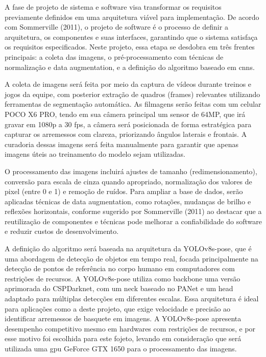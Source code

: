 \label{sssec:proj-sistema}

A fase de projeto de sistema e software visa transformar os requisitos previamente definidos em uma arquitetura viável para implementação. 
De acordo com Sommerville (2011), o projeto de software é o processo de definir a arquitetura, os componentes e suas interfaces, garantindo que o sistema satisfaça os requisitos especificados. 
Neste projeto, essa etapa se desdobra em três frentes principais: a coleta das imagens, o pré-processamento com técnicas de normalização e data augmentation, e a definição do algoritmo baseado em \acp{cnn}.

A coleta de imagens será feita por meio da captura de vídeos durante treinos e jogos da equipe, com posterior extração de quadros (frames) relevantes utilizando ferramentas de segmentação automática. 
As filmagens serão feitas com um celular POCO X6 PRO, tendo em sua câmera principal um sensor de 64MP, que irá gravar em 1080p a 30 \ac{fps}, a câmera será posicionada de forma estratégica para capturar os arremessos com clareza, 
priorizando ângulos laterais e frontais. 
A curadoria dessas imagens será feita manualmente para garantir que apenas imagens úteis ao treinamento do modelo sejam utilizadas.

O processamento das imagens incluirá ajustes de tamanho (redimensionamento), conversão para escala de cinza quando apropriado, 
normalização dos valores de pixel (entre 0 e 1) e remoção de ruídos. 
Para ampliar a base de dados, serão aplicadas técnicas de data augmentation, como rotações, mudanças de brilho e reflexões horizontais, 
conforme sugerido por Sommerville (2011) ao destacar que a reutilização de componentes e técnicas pode melhorar a confiabilidade do software e reduzir custos de desenvolvimento.

A definição do algoritmo será baseada na arquitetura da YOLOv8s-pose, que é uma abordagem de detecção de objetos em tempo real, focada principalmente na detecção de pontos de referência no corpo humano em computadores com restrições de recursos. 
A YOLOv8s-pose utiliza como backbone uma versão aprimorada do CSPDarknet, com um neck baseado no PANet e um head adaptado para múltiplas detecções em diferentes escalas. 
Essa arquitetura é ideal para aplicações como a deste projeto, que exige velocidade e precisão ao identificar arremessos de basquete em imagens. 
A YOLOv8s-pose apresenta desempenho competitivo mesmo em hardwares com restrições de recursos, e por esse motivo foi escolhida para este fojeto, levando em consideração que será utilizada uma \ac{gpu} GeForce GTX 1650 para o processamento das imagens.


